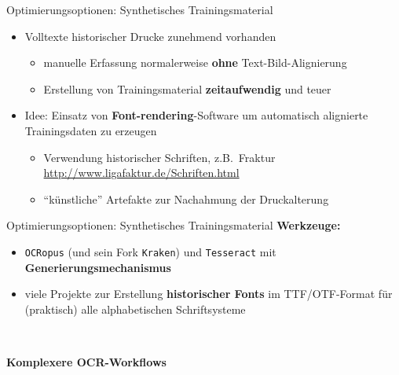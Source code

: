 \documentclass{bbawslides}
\begin{document}
\begin{bbawslide}{Optimierungsoptionen: Synthetisches Trainingsmaterial}
  \vspace*{7mm}%
  \centerslidestrue%
  \begin{itemize}
    \item Volltexte historischer Drucke zunehmend vorhanden
    \begin{itemize}\small
      \item manuelle Erfassung normalerweise \textbf{ohne} Text-Bild-Alignierung
      \item Erstellung von Trainingsmaterial \textbf{zeitaufwendig} und teuer
    \end{itemize}
    \item Idee: Einsatz von \textbf{Font-rendering}-Software um automatisch alignierte
          Trainingsdaten zu erzeugen
    \begin{itemize}\small
      \item Verwendung historischer Schriften, z.B.~Fraktur \url{http://www.ligafaktur.de/Schriften.html}
      \item \enquote{künstliche} Artefakte zur Nachahmung der Druckalterung
    \end{itemize}
  \end{itemize}
\end{bbawslide}

\begin{bbawslide}{Optimierungsoptionen: Synthetisches Trainingsmaterial}
  \vspace*{7mm}%
  \centerslidestrue%
  \textbf{Werkzeuge:}
  \begin{itemize}
    \item \texttt{OCRopus} (und sein Fork \texttt{Kraken}) und \texttt{Tesseract} mit \textbf{Generierungsmechanismus}
    \item viele Projekte zur Erstellung \textbf{historischer Fonts} im TTF/OTF-Format für (praktisch) alle alphabetischen Schriftsysteme
  \end{itemize}
  \begin{center}
    \\[2ex]
  \end{center}
\end{bbawslide}

\begin{bbawpart}{\Large\bf Komplexere OCR-Workflows}
\end{bbawpart}
\end{document}
